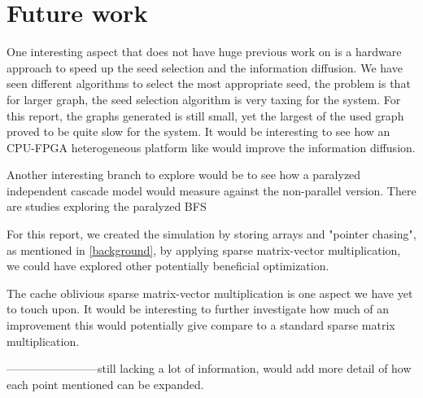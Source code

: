 \chapter{Future work}
One interesting aspect that does not have huge previous work on is a hardware approach to speed up the seed selection and the information diffusion. We have seen different algorithms to select the most appropriate seed, the problem is that for larger graph, the seed selection algorithm is very taxing for the system. For this report, the graphs generated is still small, yet the largest of the used graph proved to be quite slow for the system. It would be interesting to see how an CPU-FPGA heterogeneous platform like \cite{HybridBFS2015} would improve the information diffusion. 

Another interesting branch to explore would be to see how a paralyzed independent cascade model would measure against the non-parallel version. There are studies exploring the paralyzed BFS\cite{ParallelBFS2011}

For this report, we created the simulation by storing arrays and "pointer chasing", as mentioned in \ref{background}, by applying sparse matrix-vector multiplication, we could have explored other potentially beneficial optimization. 

The cache oblivious sparse matrix-vector multiplication is one aspect we have yet to touch upon. It would be interesting to further investigate how much of an improvement this would potentially give compare to a standard sparse matrix multiplication.

------------------------still lacking a lot of information, would add more detail of how each point mentioned can be expanded.